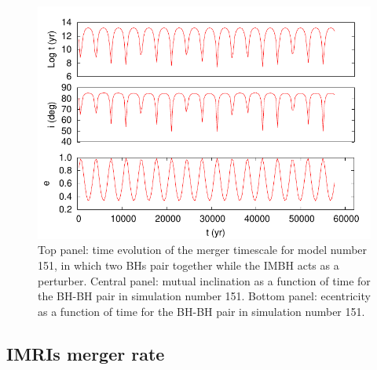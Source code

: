 \documentclass[twocolumn]{aastex62}
\begin{document}
\begin{figure}
\centering 
\includegraphics[width=\columnwidth]{kozai_151}
\caption{Top panel: time evolution of the merger timescale for model number 151, in which two BHs pair together while the IMBH acts as a perturber. Central panel: mutual inclination as a function of time for the BH-BH pair in simulation number 151. Bottom panel: ecentricity as a function of time for the BH-BH pair in simulation number 151.}
\label{F9}
\end{figure}


\subsection{IMRIs merger rate}
\end{document}
